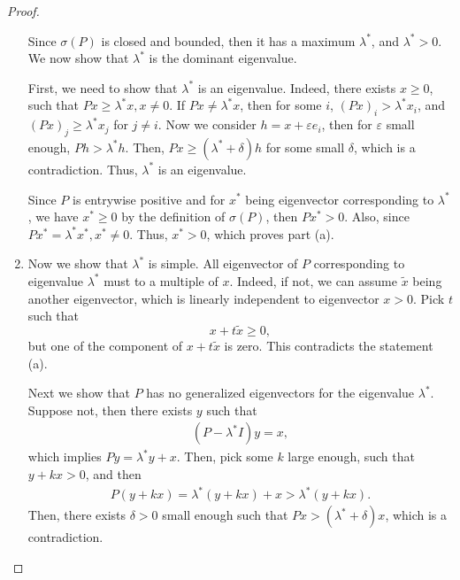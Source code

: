 \documentclass[10pt]{book}
\theoremstyle{definition}
\numberwithin{equation}{chapter}
\begin{document}
\begin{proof}
\begin{enumerate}[label=(\alph*)]
    Since $\sigma(P)$ is closed and bounded, then it has a maximum $\lambda^*$, and $\lambda^* > 0$. We now show that $\lambda^*$ is the dominant eigenvalue.
    
    First, we need to show that $\lambda^*$ is an eigenvalue. Indeed, there exists $x \geq 0$, such that $Px \geq \lambda^* x, x \neq 0$. If $Px \neq \lambda^* x$, then for some $i$, $(Px)_i > \lambda^* x_i$, and $(Px)_j \geq \lambda^* x_j$ for $j \neq i$. Now we consider $h = x + \varepsilon e_i$, then for $\varepsilon$ small enough, $Ph > \lambda^* h$. Then, $Px \geq (\lambda^* + \delta) h$ for some small $\delta$, which is a contradiction. Thus, $\lambda^*$ is an eigenvalue.
    
    Since $P$ is entrywise positive and for $x^*$ being eigenvector corresponding to $\lambda^*$, we have $x^* \geq 0$ by the definition of $\sigma(P)$, then $Px^* > 0$. Also, since $Px^* = \lambda^* x^*, x^* \neq 0$. Thus, $x^* > 0$, which proves part (a).
    
    \item Now we show that $\lambda^*$ is simple. All eigenvector of $P$ corresponding to eigenvalue $\lambda^*$ must to a multiple of $x$. Indeed, if not, we can assume $\widetilde{x}$ being another eigenvector, which is linearly independent to eigenvector $x > 0$. Pick $t$ such that 
    $$x + t \widetilde{x} \geq 0,$$
    but one of the component of $x + t \widetilde{x}$ is zero. This contradicts the statement (a).
    
    Next we show that $P$ has no generalized eigenvectors for the eigenvalue $\lambda^*$. Suppose not, then there exists $y$ such that 
    \begin{align*}
        (P - \lambda^* I)y = x,
    \end{align*}
    which implies $Py = \lambda^* y + x$. Then, pick some $k$ large enough, such that $y + kx > 0$, and then
    \begin{align*}
        P(y + kx) = \lambda^*(y + kx) + x > \lambda^* (y + kx).
    \end{align*}
    Then, there exists $\delta > 0$ small enough such that $Px > \left(\lambda^* + \delta\right)x$, which is a contradiction.
    

\end{enumerate}
\end{proof}
\end{document}
